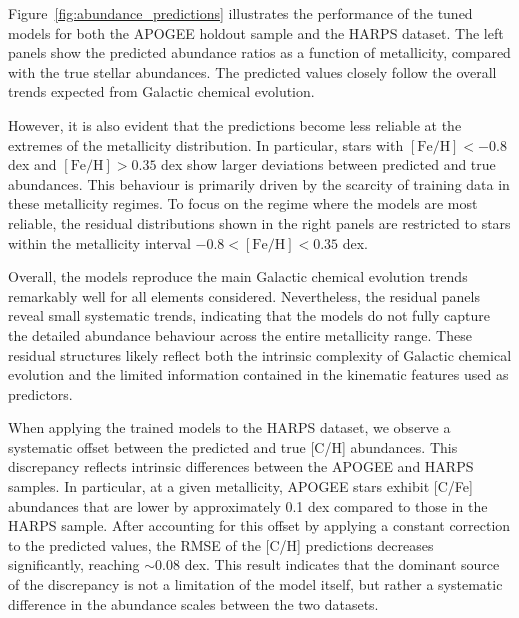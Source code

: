 \documentclass{aa}
\begin{document}
Figure~\ref{fig:abundance_predictions} illustrates the performance of the tuned models for both the APOGEE holdout sample and the HARPS dataset. The left panels show the predicted abundance ratios as a function of metallicity, compared with the true stellar abundances. The predicted values closely follow the overall trends expected from Galactic chemical evolution.

However, it is also evident that the predictions become less reliable at the extremes of the metallicity distribution. In particular, stars with $\mathrm{[Fe/H]} < -0.8$ dex and $\mathrm{[Fe/H]} > 0.35$ dex show larger deviations between predicted and true abundances. This behaviour is primarily driven by the scarcity of training data in these metallicity regimes. To focus on the regime where the models are most reliable, the residual distributions shown in the right panels are restricted to stars within the metallicity interval $-0.8 < \mathrm{[Fe/H]} < 0.35$ dex.

Overall, the models reproduce the main Galactic chemical evolution trends remarkably well for all elements considered. Nevertheless, the residual panels reveal small systematic trends, indicating that the models do not fully capture the detailed abundance behaviour across the entire metallicity range. These residual structures likely reflect both the intrinsic complexity of Galactic chemical evolution and the limited information contained in the kinematic features used as predictors.

When applying the trained models to the HARPS dataset, we observe a systematic offset between the predicted and true [C/H] abundances. This discrepancy reflects intrinsic differences between the APOGEE and HARPS samples. In particular, at a given metallicity, APOGEE stars exhibit [C/Fe] abundances that are lower by approximately 0.1 dex compared to those in the HARPS sample. After accounting for this offset by applying a constant correction to the predicted values, the RMSE of the [C/H] predictions decreases significantly, reaching $\sim$0.08 dex. This result indicates that the dominant source of the discrepancy is not a limitation of the model itself, but rather a systematic difference in the abundance scales between the two datasets.
\end{document}
